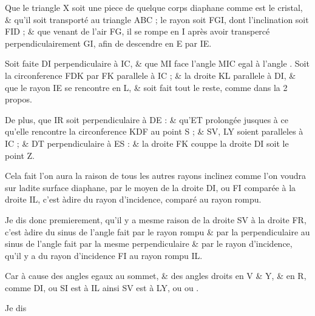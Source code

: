 \documentclass[11pt,a4paper]{article}
\begin{document}
Que le triangle X soit \struck{\ill{}} une piece de quelque corps diaphane comme est le cristal, \& qu'il soit transporté au triangle ABC ; le rayon soit FGI, dont l'inclination soit FID ; \& que venant de l'air FG, il se rompe en I après avoir transpercé  perpendiculairement GI, afin de descendre en E par IE.

Soit faite DI perpendiculaire à IC, \& \struck{\ill{}} que MI face l'angle MIC egal à l'angle . Soit la circonference FDK  par FK parallele à IC ; \& la droite KL parallele à DI, \& que le rayon IE se rencontre en L, \& soit fait tout le reste, comme dans la 2 propos.

De plus, que IR soit perpendiculaire à DE : \& qu'ET prolongée jusques à ce qu'elle rencontre la circonference KDF au point S ; \& SV, LY soient paralleles à IC ; \& DT perpendiculaire à ES : \&   la droite FK couppe la droite DI soit le point Z.

Cela fait l'on aura la raison de tous les autres rayons inclinez comme l'on voudra sur ladite surface diaphane, par le moyen de la droite DI, ou FI comparée à la droite IL, c'est àdire du rayon d'incidence, comparé au rayon rompu.

Je dis donc premierement, qu'il y a mesme raison de la droite SV à la droite FR, c'est àdire du sinus de l'angle fait par le rayon rompu \& par la perpendiculaire au sinus de l'angle fait par la mesme perpendiculaire \& par le rayon d'incidence, qu'il y a du rayon d'incidence FI au rayon rompu IL.

Car à cause des angles egaux au sommet, \& des \struck{\ill{}} angles droits en V \& Y, \& en R, comme DI, ou SI est à IL ainsi SV est à LY, ou  ou .

Je dis
\end{document}
